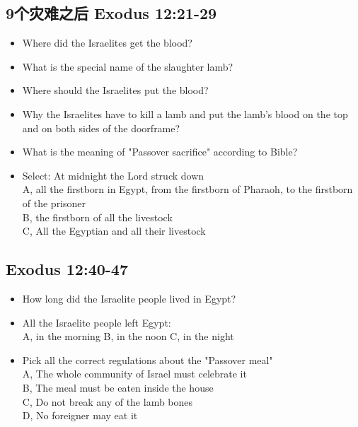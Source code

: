 \subsection{9个灾难之后 Exodus 12:21-29}
\large
\begin{itemize}
\item Where did the Israelites get the blood?
\item What is the special name of the slaughter lamb?
\item Where should the Israelites put the blood?
\item Why the Israelites have to kill a lamb and put the lamb's blood on the top and on both sides of the doorframe?
\item What is the meaning of "Passover sacrifice" according to Bible?
\item Select: At midnight the Lord struck down\\
A, all the firstborn in Egypt, from the firstborn of Pharaoh, to the firstborn of the prisoner\\
B, the firstborn of all the livestock\\
C, All the Egyptian and all their livestock
\end{itemize}

\newpage
\subsection{Exodus 12:40-47}
\large
\begin{itemize}
\item How long did the Israelite people lived in Egypt?
\item All the Israelite people left Egypt: \\
A, in the morning \hspace{1cm}  B, in the noon \hspace{1cm}       C, in the night 
\item Pick all the correct regulations about the "Passover meal"\\
A, The whole community of Israel must celebrate it\\
B, The meal must be eaten inside the house\\
C, Do not break any of the lamb bones\\
D, No foreigner may eat it\\
\end{itemize}


